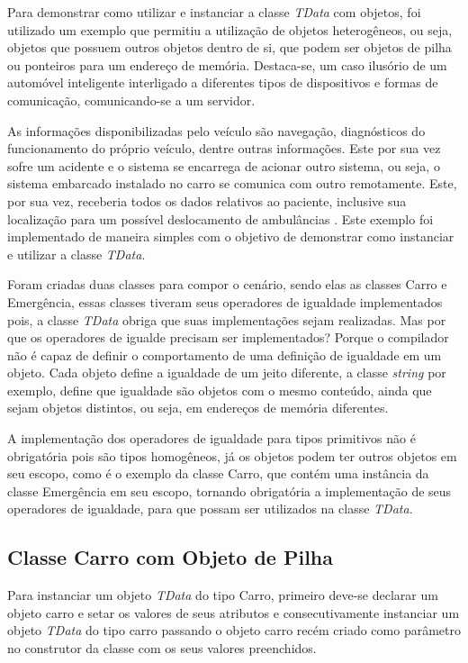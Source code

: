 Para demonstrar como utilizar e instanciar a classe \textit{TData} com objetos, foi utilizado um exemplo que permitiu a utilização de objetos heterogêneos, ou seja, objetos que possuem outros objetos dentro de si, que podem ser objetos de pilha ou ponteiros para um endereço de memória. Destaca-se, um caso ilusório de um automóvel inteligente interligado a diferentes tipos de dispositivos e formas de comunicação, comunicando-se a um servidor. 

As informações disponibilizadas pelo veículo são navegação, diagnósticos do funcionamento do próprio veículo, dentre outras informações. Este por sua vez sofre um acidente e o sistema se encarrega de acionar outro sistema, ou seja, o sistema embarcado instalado no carro se comunica com outro remotamente. Este, por sua vez, receberia todos os dados relativos ao paciente, inclusive sua localização para um possível deslocamento de ambulâncias \cite{Valderi:2008}. Este exemplo foi implementado de maneira simples com o objetivo de demonstrar como instanciar e utilizar a classe \textit{TData}. 

Foram criadas duas classes para compor o cenário, sendo elas as classes Carro e Emergência, essas classes tiveram seus operadores de igualdade implementados pois, a classe \textit{TData} obriga que suas implementações sejam realizadas. Mas por que os operadores de igualde precisam ser implementados? Porque o compilador não é capaz de definir o comportamento de uma definição de igualdade em um objeto. Cada objeto define a igualdade de um jeito diferente, a classe \textit{string} por exemplo, define que igualdade são objetos com o mesmo conteúdo, ainda que sejam objetos distintos, ou seja, em endereços de memória diferentes.

A implementação dos operadores de igualdade para tipos primitivos não é obrigatória pois são tipos homogêneos, já os objetos podem ter outros objetos em seu escopo, como é o exemplo da classe Carro, que contém uma instância da classe Emergência em seu escopo, tornando obrigatória a implementação de seus operadores de igualdade, para que possam ser utilizados na classe \textit{TData}.

\subsection{Classe Carro com Objeto de Pilha} \label{subsec:classeObjetoPilha}

Para instanciar um objeto \textit{TData} do tipo Carro, primeiro deve-se declarar um objeto carro e setar os valores de seus atributos e consecutivamente instanciar um objeto \textit{TData} do tipo carro passando o objeto carro recém criado como parâmetro no construtor da classe com os seus valores preenchidos. 


